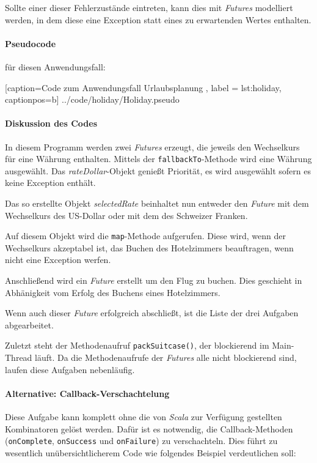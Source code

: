 Sollte einer dieser Fehlerzustände eintreten, kann dies mit \emph{Futures} 
modelliert werden, in dem diese eine Exception statt eines zu 
erwartenden Wertes enthalten.

\paragraph{Pseudocode} für diesen Anwendungsfall:


    [caption={Code zum Anwendungsfall \glqq Urlaubsplanung\grqq{} },
       label = lst:holiday,
       captionpos=b]
 {../code/holiday/Holiday.pseudo}
 
\paragraph{Diskussion des Codes}

In diesem Programm werden zwei \emph{Futures} erzeugt, die jeweils
den Wechselkurs für eine Währung enthalten. Mittels der
\texttt{fallbackTo}-Methode wird eine Währung ausgewählt.
Das \emph{rateDollar}-Objekt genießt Priorität, es wird ausgewählt
sofern es keine Exception enthält.

Das so erstellte Objekt \emph{selectedRate} beinhaltet nun entweder
den \emph{Future} mit dem Wechselkurs des US-Dollar oder mit dem des
Schweizer Franken.

Auf diesem Objekt wird die \texttt{map}-Methode aufgerufen. Diese wird,
wenn der Wechselkurs akzeptabel ist, das Buchen des Hotelzimmers beauftragen,
wenn nicht eine Exception werfen.

Anschließend wird ein \emph{Future} erstellt um den Flug zu buchen. Dies
geschieht in Abhänigkeit vom Erfolg des Buchens eines Hotelzimmers.

Wenn auch dieser \emph{Future} erfolgreich abschließt, ist die
Liste der drei Aufgaben abgearbeitet.

Zuletzt steht der Methodenaufruf \texttt{packSuitcase()}, der blockierend
im Main-Thread läuft. Da die Methodenaufrufe der \emph{Futures} alle
nicht blockierend sind, laufen diese Aufgaben nebenläufig.

\paragraph{Alternative: Callback-Verschachtelung} Diese Aufgabe kann
komplett ohne die von \emph{Scala} zur Verfügung gestellten
Kombinatoren gelöst werden. Dafür ist es notwendig, die Callback-Methoden
(\texttt{onComplete}, \texttt{onSuccess} und \texttt{onFailure}) zu
verschachteln. Dies führt zu wesentlich unübersichtlicherem Code
wie folgendes Beispiel verdeutlichen soll:

